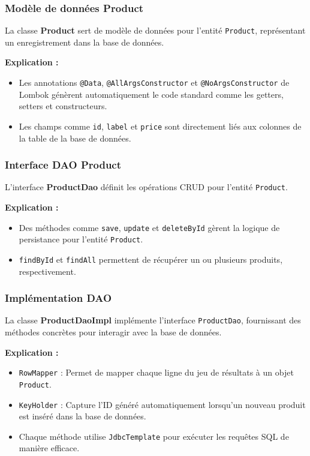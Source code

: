\documentclass{article}
\begin{document}
\subsubsection{Modèle de données Product}

La classe \textbf{Product} sert de modèle de données pour l'entité \texttt{Product}, représentant un enregistrement dans la base de données.

\textbf{Explication :}
\begin{itemize}
    \item Les annotations \texttt{@Data}, \texttt{@AllArgsConstructor} et \texttt{@NoArgsConstructor} de Lombok génèrent automatiquement le code standard comme les getters, setters et constructeurs.
    \item Les champs comme \texttt{id}, \texttt{label} et \texttt{price} sont directement liés aux colonnes de la table de la base de données.
\end{itemize}

\subsubsection{Interface DAO Product}

L'interface \textbf{ProductDao} définit les opérations CRUD pour l'entité \texttt{Product}.

\textbf{Explication :}
\begin{itemize}
    \item Des méthodes comme \texttt{save}, \texttt{update} et \texttt{deleteById} gèrent la logique de persistance pour l'entité \texttt{Product}.
    \item \texttt{findById} et \texttt{findAll} permettent de récupérer un ou plusieurs produits, respectivement.
\end{itemize}

\subsubsection{Implémentation DAO}

La classe \textbf{ProductDaoImpl} implémente l'interface \texttt{ProductDao}, fournissant des méthodes concrètes pour interagir avec la base de données.

\textbf{Explication :}
\begin{itemize}
    \item \texttt{RowMapper} : Permet de mapper chaque ligne du jeu de résultats à un objet \texttt{Product}.
    \item \texttt{KeyHolder} : Capture l'ID généré automatiquement lorsqu'un nouveau produit est inséré dans la base de données.
    \item Chaque méthode utilise \texttt{JdbcTemplate} pour exécuter les requêtes SQL de manière efficace.
\end{itemize}
\end{document}
